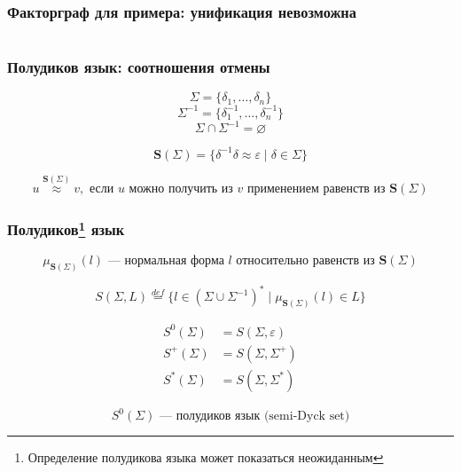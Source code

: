 \documentclass{beamer}
\begin{document}
\begin{frame}[fragile]
  \frametitle{Факторграф для примера: унификация невозможна}

  \begin{columns}
    \begin{column}{0.3\textwidth}
        
    \end{column}
    \begin{column}{0.7\textwidth}
      \begin{center}
        
      \end{center}
    \end{column}
    \end{columns}
\end{frame}

\begin{frame}[fragile]
  \frametitle{Полудиков язык: соотношения отмены}
\[
  \Sigma = \{\delta_1, \dots, \delta_n \}
\]
\[
  \Sigma^{-1} = \{\delta_1^{-1}, \dots, \delta_n^{-1} \}
\]
\[
  \Sigma \cap \Sigma^{-1} = \varnothing
\]

\[
  \bm{S}(\Sigma) = \{\delta^{-1} \delta \approx \varepsilon \mid \delta \in \Sigma \}
\]

\[
  u \stackrel{\bm{S}(\Sigma)}{\approx} v, \text{ если } u \text{ можно получить из } v \text{ применением равенств из } \bm{S}(\Sigma)
\]
\end{frame}

\begin{frame}[fragile]
  \frametitle{Полудиков\footnote{Определение полудикова языка может показаться неожиданным} язык}
\[
  \mu_{\bm{S}(\Sigma)}(l) \text{ --- нормальная форма } l \text{ относительно равенств из } \bm{S}(\Sigma)
\]

\[
  S(\Sigma, L) \stackrel{def}{=} \{ l \in (\Sigma \cup \Sigma^{-1})^* \mid \mu_{\bm{S}(\Sigma)}(l) \in L\}
\]

\begin{align*}
  S^0(\Sigma) &= S(\Sigma, {\varepsilon}) \\
  S^+(\Sigma) &= S(\Sigma, \Sigma^+) \\
  S^*(\Sigma) &= S(\Sigma, \Sigma^*)
\end{align*}

\bigskip

  \[
    S^0(\Sigma) \text{ --- полудиков язык (semi-Dyck set)}
  \]

  \bigskip

\end{frame}
\end{document}
